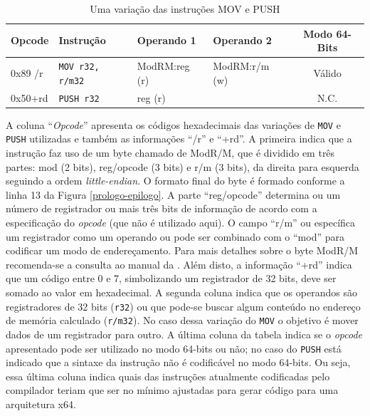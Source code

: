 \begin{table}[ht!]
  \caption{Uma variação das instruções MOV e PUSH\label{mov-push-1}}
  \centering
  \begin{tabular}{l l l l c}
    \toprule
    Opcode  & Instrução     & Operando 1    & Operando 2    &  Modo 64-Bits \\
    \midrule
    0x89 /r & \verb!MOV r32, r/m32!& ModRM:reg (r) & ModRM:r/m (w) &  Válido       \\
    0x50+rd & \verb!PUSH r32!      & reg (r)       &               &  N.C.         \\
    \bottomrule
  \end{tabular}
\end{table}

A coluna ``\textit{Opcode}'' apresenta
os códigos hexadecimais das variações de \verb!MOV! e \verb!PUSH!
utilizadas e também as informações ``/r'' e ``+rd''. A primeira
indica que a instrução faz uso de um byte chamado de ModR/M, que é
dividido em três partes: mod (2 bits),
reg/opcode (3 bits) e r/m (3 bits), da direita para esquerda seguindo
a ordem \textit{little-endian}. O formato final do byte é formado conforme
a linha 13 da Figura \ref{prologo-epilogo}.
A parte ``reg/opcode'' determina ou um
número de registrador ou mais três bits de informação de acordo com
a especificação do \textit{opcode} (que não é utilizado aqui). O campo
``r/m'' ou específica um registrador como um operando ou pode ser
combinado com o ``mod'' para codificar um modo de endereçamento. Para
mais detalhes sobre o byte ModR/M recomenda-se a consulta ao manual da
. Além disto,
a informação ``+rd'' indica que um código entre 0
e 7, simbolizando um registrador de 32 bits, deve ser somado ao valor
em hexadecimal. A segunda coluna indica que os operandos são
registradores de 32 bits (\verb!r32!) ou que pode-se buscar algum
conteúdo no endereço de memória calculado (\verb!r/m32!). No
caso dessa variação do \verb!MOV! o objetivo é mover dados de um
registrador para outro. A última coluna da tabela indica se o
\textit{opcode} apresentado pode ser utilizado no modo 64-bits ou não;
no caso do \verb!PUSH! está indicado que a sintaxe da instrução
não é codificável no modo 64-bits. Ou seja, essa última coluna
indica quais das instruções atualmente codificadas pelo
compilador teriam que ser no mínimo ajustadas para gerar código para
uma arquitetura x64.


